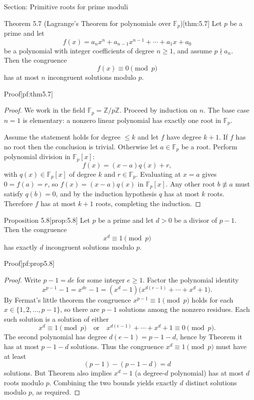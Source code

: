 \documentclass[10pt]{article}
\theoremstyle{definition}
\theoremstyle{plain}
\numberwithin{equation}{section}
\begin{document}
\bigskip

\begin{define}{Section: Primitive roots for prime moduli}
\end{define}

\begin{define}{Theorem 5.7 (Lagrange's Theorem for polynomials over $\mathbb{F}_p$)}[thm:5.7]
Let $p$ be a prime and let
\[
f(x)=a_n x^n + a_{n-1}x^{n-1} +\cdots + a_1 x + a_0
\]
be a polynomial with integer coefficients of degree $n\ge 1$, and assume $p\nmid a_n$. Then the congruence
\[
f(x)\equiv 0 \pmod p
\]
has at most $n$ incongruent solutions modulo $p$.
\end{define}

\begin{define}{Proof}[pf:thm5.7]
\begin{proof}
We work in the field $\mathbb{F}_p=\mathbb{Z}/p\mathbb{Z}$. Proceed by induction on $n$. The base case $n=1$ is elementary: a nonzero linear polynomial has exactly one root in $\mathbb{F}_p$.

Assume the statement holds for degree $\le k$ and let $f$ have degree $k+1$. If $f$ has no root then the conclusion is trivial. Otherwise let $a\in\mathbb{F}_p$ be a root. Perform polynomial division in $\mathbb{F}_p[x]$:
\[
f(x)=(x-a)q(x)+r,
\]
with $q(x)\in\mathbb{F}_p[x]$ of degree $k$ and $r\in\mathbb{F}_p$. Evaluating at $x=a$ gives $0=f(a)=r$, so $f(x)=(x-a)q(x)$ in $\mathbb{F}_p[x]$. Any other root $b\not\equiv a$ must satisfy $q(b)=0$, and by the induction hypothesis $q$ has at most $k$ roots. Therefore $f$ has at most $k+1$ roots, completing the induction.
\end{proof}
\end{define}

\begin{define}{Proposition 5.8}[prop:5.8]
Let $p$ be a prime and let $d>0$ be a divisor of $p-1$. Then the congruence
\[
x^d \equiv 1 \pmod p
\]
has exactly $d$ incongruent solutions modulo $p$.
\end{define}

\begin{define}{Proof}[pf:prop5.8]
\begin{proof}
Write $p-1 = d e$ for some integer $e\ge1$. Factor the polynomial identity
\[
x^{p-1}-1 = x^{de}-1 = (x^d-1)\bigl(x^{d(e-1)}+\cdots+x^d+1\bigr).
\]
By Fermat's little theorem the congruence $x^{p-1}\equiv 1\pmod p$ holds for each $x\in\{1,2,\dots,p-1\}$, so there are $p-1$ solutions among the nonzero residues. Each such solution is a solution of either
\[
x^d\equiv 1\pmod p\quad\text{or}\quad x^{d(e-1)}+\cdots + x^d + 1 \equiv 0\pmod p.
\]
The second polynomial has degree $d(e-1)=p-1-d$, hence by Theorem  it has at most $p-1-d$ solutions. Thus the congruence $x^d\equiv 1\pmod p$ must have at least
\[
(p-1) - (p-1-d) = d
\]
solutions. But Theorem  also implies $x^d-1$ (a degree-$d$ polynomial) has at most $d$ roots modulo $p$. Combining the two bounds yields exactly $d$ distinct solutions modulo $p$, as required.
\end{proof}
\end{define}
\end{document}
